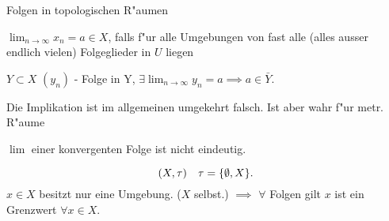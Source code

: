 \documentclass[class=article, crop=false]{standalone}
\begin{document}
\begin{zettel}{Folgen in topologischen R"aumen}
\begin{flashcard}
    \begin{definition}[Limes]
    $\lim_{n \to \infty} x_n =  a \in X$, falls f"ur alle Umgebungen von fast alle (alles ausser endlich vielen) Folgeglieder  in $U$ liegen
    \end{definition}
\end{flashcard}
\begin{lemma}
    $Y \subset X$ $(y_n)$ - Folge in Y, $\exists \lim_{n \to \infty}y_n = a \implies  a \in  \bar{Y}$.
\end{lemma}
\begin{remark}
    Die Implikation ist im allgemeinen umgekehrt falsch. Ist aber wahr f"ur metr. R"aume
\end{remark}
\begin{remark}
    $\lim$ einer konvergenten Folge ist nicht eindeutig.
    
    \begin{example}
        \[
            (X, \tau ) \quad \tau =  \set{\emptyset, X}
        .\]
        $ x \in  X$ besitzt nur eine Umgebung. ($X$ selbst.) $\implies $  $\forall $ Folgen gilt $x$ ist ein Grenzwert $\forall x \in  X$.
    \end{example}
        
\end{remark}
\end{zettel}
\end{document}
